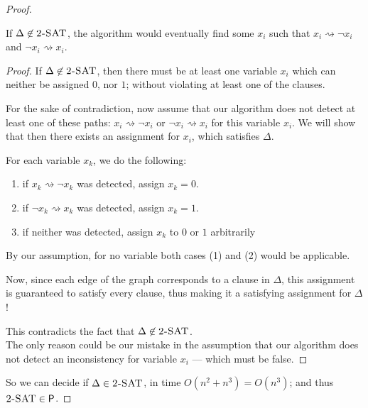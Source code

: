 \documentclass[usletter]{article}
\newcommand {\namedlangset}[1] {\ensuremath{\textnormal{\textsc{#1}}}}
\newcommand {\family}[1]       {\ensuremath{\mathsf{#1}}}
\newcommand {\PTime}  {\family{P}}
\begin{document}
\begin{enumerate}[labelsep=2.5em, label=\textbf{\arabic{enumi}}]
\begin{proof}
    \begin{claim}[Completeness]
      If $\Delta \not\in \namedlangset{2-SAT}$, the algorithm would eventually
      find some $x_i$ such that $x_i \rightsquigarrow \neg x_i$ and
      $\neg x_i \rightsquigarrow x_i$.
    \end{claim}
    \begin{proof}
      If $\Delta \not\in \namedlangset{2-SAT}$, then there must be at least one
      variable $x_i$ which can neither be assigned $0$, nor $1$; without
      violating at least one of the clauses.

      For the sake of contradiction, now assume that our algorithm does not
      detect at least one of these paths: $x_i \rightsquigarrow \neg x_i$ or
      $\neg x_i \rightsquigarrow x_i$ for this variable $x_i$. We will show that
      then there exists an assignment for $x_i$, which satisfies $\Delta$.

      For each variable $x_k$, we do the following:
      \begin{enumerate}
        \item if $x_k \rightsquigarrow \neg x_k$ was detected, assign $x_k = 0$.
        \item if $\neg x_k \rightsquigarrow x_k$ was detected, assign $x_k = 1$.
        \item if neither was detected, assign $x_k$ to $0$ or $1$ arbitrarily
      \end{enumerate}
      By our assumption, for no variable both cases (1) and (2) would be
      applicable.

      Now, since each edge of the graph corresponds to a clause in $\Delta$,
      this assignment is guaranteed to satisfy every clause, thus making it a
      satisfying assignment for $\Delta$!

      This contradicts the fact that $\Delta \not\in \namedlangset{2-SAT}$. \\
      The only reason could be our mistake in the assumption that our algorithm
      does not detect an inconsistency for variable $x_i$ --- which must be
      false.
    \end{proof}

    So we can decide if $\Delta \in \namedlangset{2-SAT}$, in time
    $O(n^2 + n^3) = O(n^3)$; and thus $\namedlangset{2-SAT} \in \PTime$.
  \end{proof}



\end{enumerate}
\end{document}

